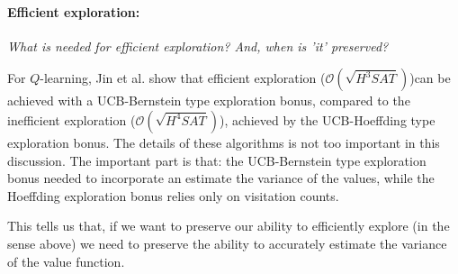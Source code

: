 
\paragraph{Efficient exploration:} \textsl{What is needed for efficient exploration? And, when is 'it' preserved?}

For $Q$-learning, Jin et al. \cite{Bubeck2018} show that efficient exploration ($\mathcal O(\sqrt{H^3SAT})$)\footnotemark[13] can be
achieved with a UCB-Bernstein type exploration bonus, compared to the inefficient exploration ($\mathcal O(\sqrt{H^4SAT})$),
achieved by the UCB-Hoeffding type exploration bonus. The details of these algorithms is not too important in this discussion.
The important part is that: the UCB-Bernstein type exploration bonus needed to incorporate an
estimate the variance of the values, while the Hoeffding exploration bonus relies only on visitation counts.


This tells us that, if we want to preserve our ability to efficiently explore (in the sense above) we need to preserve the  ability to accurately estimate the variance of the value function.



%
%
%
%
%

